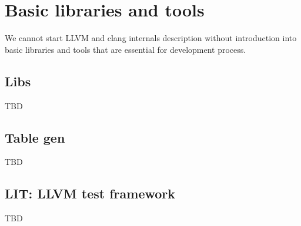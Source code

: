 \chapter{Basic libraries and tools}
We cannot start LLVM and clang internals description without introduction into
basic libraries and tools that are essential for development process.

\section{Libs}
TBD

\section{Table gen}
TBD

\section{LIT: LLVM test framework}
TBD
